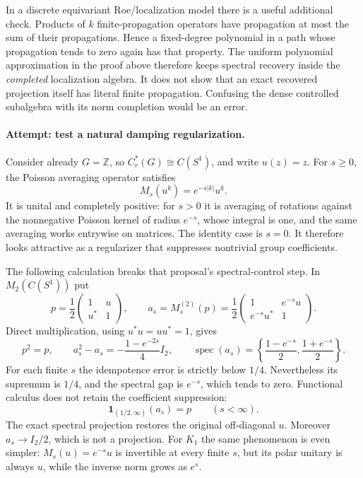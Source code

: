 \documentclass[11pt]{article}
\newcommand{\Z}{\mathbb{Z}}
\begin{document}
In a discrete equivariant Roe/localization model there is a useful
additional check. Products of $k$ finite-propagation operators have
propagation at most the sum of their propagations. Hence a fixed-degree
polynomial in a path whose propagation tends to zero again has that
property. The uniform polynomial approximation in the proof above
therefore keeps spectral recovery inside the \emph{completed}
localization algebra. It does not show that an exact recovered projection
itself has literal finite propagation. Confusing the dense controlled
subalgebra with its norm completion would be an error.

\paragraph{Attempt: test a natural damping regularization.}
Consider already $G=\Z$, so $C_r^*(G)\cong C(S^1)$, and write $u(z)=z$.
For $s\ge0$, the Poisson averaging operator satisfies
\[
 M_s(u^k)=e^{-s|k|}u^k.
\]
It is unital and completely positive: for $s>0$ it is averaging of
rotations against the nonnegative Poisson kernel of radius $e^{-s}$,
whose integral is one, and the same averaging works entrywise on
matrices. The identity case is $s=0$. It therefore looks attractive as a
regularizer that suppresses nontrivial group coefficients.

The following calculation breaks that proposal's spectral-control step.
In $M_2(C(S^1))$ put
\[
 p=\frac12\begin{pmatrix}1&u\\u^*&1\end{pmatrix},\qquad
 a_s=M_s^{(2)}(p)=\frac12
 \begin{pmatrix}1&e^{-s}u\\e^{-s}u^*&1\end{pmatrix}.
\]
Direct multiplication, using $u^*u=uu^*=1$, gives
\begin{equation}\label{ra:statement:damping}
 p^2=p,\qquad
 a_s^2-a_s=-\frac{1-e^{-2s}}4 I_2,
 \qquad
 \operatorname{spec}(a_s)=
 \left\{\frac{1-e^{-s}}2,\frac{1+e^{-s}}2\right\}.
\end{equation}
For each finite $s$ the idempotence error is strictly below $1/4$.
Nevertheless its supremum is $1/4$, and the spectral gap is $e^{-s}$,
which tends to zero. Functional calculus does not retain the coefficient
suppression:
\begin{equation}\label{ra:statement:undamping}
 \mathbf1_{(1/2,\infty)}(a_s)=p\qquad(s<\infty).
\end{equation}
The exact spectral projection restores the original off-diagonal $u$.
Moreover $a_s\to I_2/2$, which is not a projection. For $K_1$ the same
phenomenon is even simpler: $M_s(u)=e^{-s}u$ is invertible at every finite
$s$, but its polar unitary is always $u$, while the inverse norm grows
as $e^s$.
\end{document}
